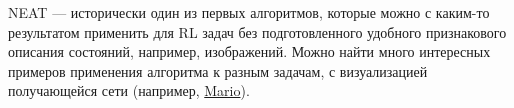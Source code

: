 \begin{example}
NEAT --- исторически один из первых алгоритмов, которые можно с каким-то результатом применить для RL задач без подготовленного удобного признакового описания состояний, например, изображений. Можно найти много интересных примеров применения алгоритма к разным задачам, с визуализацией получающейся сети (например, \href{https://www.youtube.com/watch?v=qv6UVOQ0F44}{Mario}). 

\end{example}

